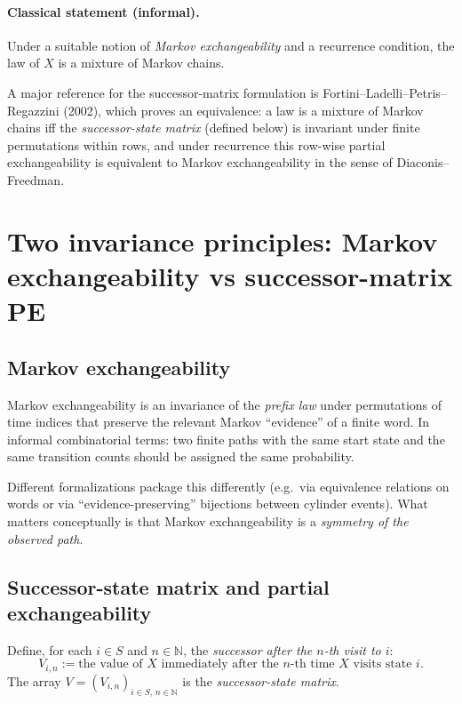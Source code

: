 \documentclass[11pt]{article}
\newcommand{\N}{\mathbb{N}}
\begin{document}
\paragraph{Classical statement (informal).}
Under a suitable notion of \emph{Markov exchangeability} and a recurrence condition, the law of \(X\) is a mixture of Markov chains.

A major reference for the successor-matrix formulation is Fortini--Ladelli--Petris--Regazzini (2002), which proves an equivalence:
a law is a mixture of Markov chains iff the \emph{successor-state matrix} (defined below) is invariant under finite permutations within rows,
and under recurrence this row-wise partial exchangeability is equivalent to Markov exchangeability
in the sense of Diaconis--Freedman. \cite{FortiniEtAl2002}

\section{Two invariance principles: Markov exchangeability vs successor-matrix PE}

\subsection{Markov exchangeability}

Markov exchangeability is an invariance of the \emph{prefix law} under permutations of time indices that preserve the relevant Markov ``evidence'' of a finite word.
In informal combinatorial terms: two finite paths with the same start state and the same transition counts should be assigned the same probability.

Different formalizations package this differently (e.g.\ via equivalence relations on words or via ``evidence-preserving'' bijections between cylinder events).
What matters conceptually is that Markov exchangeability is a \emph{symmetry of the observed path}.

\subsection{Successor-state matrix and partial exchangeability}

Define, for each \(i \in S\) and \(n \in \N\), the \emph{successor after the \(n\)-th visit to \(i\)}:
\[
V_{i,n} := \text{the value of \(X\) immediately after the \(n\)-th time \(X\) visits state \(i\)}.
\]
The array \(V = (V_{i,n})_{i \in S,\, n \in \N}\) is the \emph{successor-state matrix}.
\end{document}
